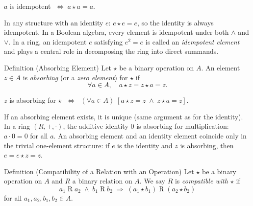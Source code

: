 \begin{remark}
$a$ is idempotent $\;\iff\; a \star a = a$.
\end{remark}

\begin{remark}[Examples]
In any structure with an identity $e$: $e \star e = e$, so the identity
is always idempotent.
In a Boolean algebra, every element is idempotent under both $\land$ and $\lor$.
In a ring, an idempotent $e$ satisfying $e^2 = e$ is called an
\emph{idempotent element} and plays a central role in decomposing the ring
into direct summands.
\end{remark}

\begin{definitionbox}{Definition (Absorbing Element)}
\label{def:absorbing-element}
Let $\star$ be a binary operation on $A$.
An element $z \in A$ is \emph{absorbing} (or a \emph{zero element})
for $\star$ if
\[
  \forall a \in A,\quad a \star z = z \star a = z.
\]
\end{definitionbox}

\begin{remark}
$z$ is absorbing for $\star$
$\;\iff\;$
$(\forall a \in A)\;[a \star z = z \;\land\; z \star a = z]$.
\end{remark}

\begin{remark}
If an absorbing element exists, it is unique (same argument as for the
identity).
In a ring $(R, +, \cdot)$, the additive identity $0$ is absorbing for
multiplication: $a \cdot 0 = 0$ for all $a$.
An absorbing element and an identity element coincide only in the trivial
one-element structure: if $e$ is the identity and $z$ is absorbing,
then $e = e \star z = z$.
\end{remark}


\begin{definitionbox}{Definition (Compatibility of a Relation with an Operation)}
\label{def:compatibility}
Let $\star$ be a binary operation on $A$ and $R$ a binary relation on $A$.
We say $R$ is \emph{compatible with $\star$} if
\[
  a_1 \mathrel{R} a_2 \;\land\; b_1 \mathrel{R} b_2
  \;\Rightarrow\;
  (a_1 \star b_1) \mathrel{R} (a_2 \star b_2)
\]
for all $a_1, a_2, b_1, b_2 \in A$.
\end{definitionbox}

